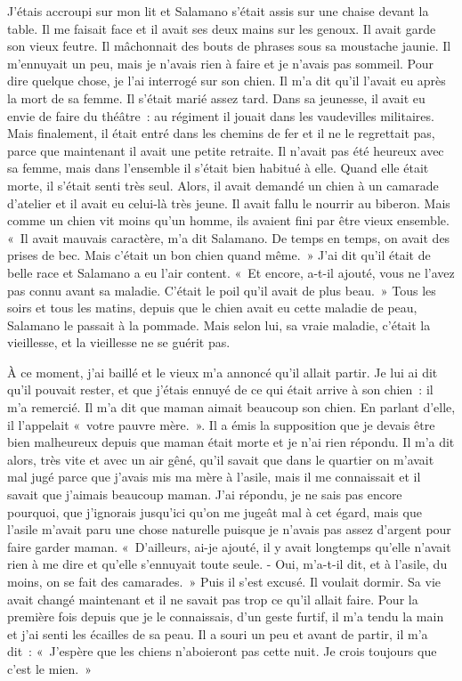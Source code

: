 \documentclass[french,twoside]{book} %
\newcommand\chapterclose{} %
\begin{document}
J'étais accroupi sur mon lit et Salamano s’était assis sur une chaise devant la table. Il me faisait face et il avait ses deux mains sur les genoux. Il avait garde son vieux feutre. Il mâchonnait des bouts de phrases sous sa moustache jaunie. Il m’ennuyait un peu, mais je n’avais rien à faire et je n’avais pas sommeil. Pour dire quelque chose, je l’ai interrogé sur son chien. Il m’a dit qu’il l’avait eu après la mort de sa femme. Il s’était marié assez tard. Dans sa jeunesse, il avait eu envie de faire du théâtre : au régiment il jouait dans les vaudevilles militaires. Mais finalement, il était entré dans les chemins de fer et il ne le regrettait pas, parce que maintenant il avait une petite retraite. Il n’avait pas été heureux avec sa femme, mais dans l’ensemble il s’était bien habitué à elle. Quand elle était morte, il s’était senti très seul. Alors, il avait demandé un chien à un camarade d’atelier et il avait eu celui-là très jeune. Il avait fallu le nourrir au biberon. Mais comme un chien vit moins qu’un homme, ils avaient fini par être vieux ensemble. « Il avait mauvais caractère, m’a dit Salamano. De temps en temps, on avait des prises de bec. Mais c’était un bon chien quand même. » J'ai dit qu’il était de belle race et Salamano a eu l’air content. « Et encore, a-t-il ajouté, vous ne l’avez pas connu avant sa maladie. C'était le poil qu’il avait de plus beau. » Tous les soirs et tous les matins, depuis que le chien avait eu cette maladie de peau, Salamano le passait à la pommade. Mais selon lui, sa vraie maladie, c’était la vieillesse, et la vieillesse ne se guérit pas.\par
À ce moment, j’ai baillé et le vieux m’a annoncé qu’il allait partir. Je lui ai dit qu’il pouvait rester, et que j’étais ennuyé de ce qui était arrive à son chien : il m’a remercié. Il m’a dit que maman aimait beaucoup son chien. En parlant d’elle, il l’appelait « votre pauvre mère. ». Il a émis la supposition que je devais être bien malheureux depuis que maman était morte et je n’ai rien répondu. Il m’a dit alors, très vite et avec un air gêné, qu’il savait que dans le quartier on m’avait mal jugé parce que j’avais mis ma mère à l’asile, mais il me connaissait et il savait que j’aimais beaucoup maman. J'ai répondu, je ne sais pas encore pourquoi, que j’ignorais jusqu’ici qu’on me jugeât mal à cet égard, mais que l’asile m’avait paru une chose naturelle puisque je n’avais pas assez d’argent pour faire garder maman. « D'ailleurs, ai-je ajouté, il y avait longtemps qu’elle n’avait rien à me dire et qu’elle s’ennuyait toute seule. - Oui, m’a-t-il dit, et à l’asile, du moins, on se fait des camarades. » Puis il s’est excusé. Il voulait dormir. Sa vie avait changé maintenant et il ne savait pas trop ce qu’il allait faire. Pour la première fois depuis que je le connaissais, d’un geste furtif, il m’a tendu la main et j’ai senti les écailles de sa peau. Il a souri un peu et avant de partir, il m’a dit : « J'espère que les chiens n’aboieront pas cette nuit. Je crois toujours que c’est le mien. »
\chapterclose
\end{document}

